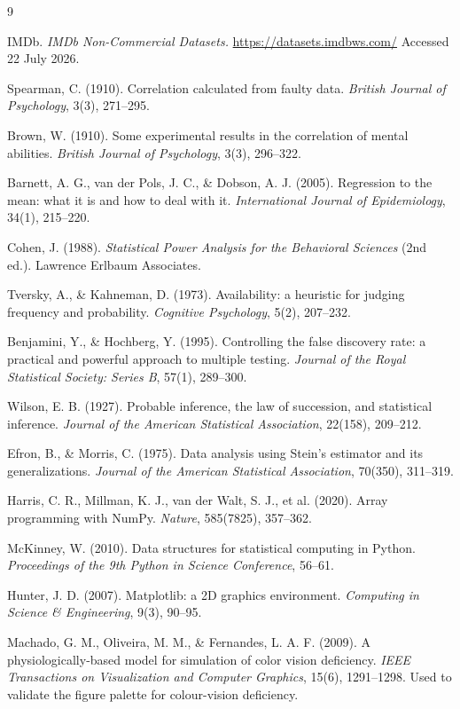 \documentclass[11pt,a4paper]{article}
\begin{document}
\begin{thebibliography}{9}
\small

IMDb. \emph{IMDb Non-Commercial Datasets.} \url{https://datasets.imdbws.com/}
Accessed 22 July 2026.

Spearman, C. (1910). Correlation calculated from faulty data.
\emph{British Journal of Psychology}, 3(3), 271--295.

Brown, W. (1910). Some experimental results in the correlation of mental
abilities. \emph{British Journal of Psychology}, 3(3), 296--322.

Barnett, A. G., van der Pols, J. C., \& Dobson, A. J. (2005). Regression to the
mean: what it is and how to deal with it. \emph{International Journal of
Epidemiology}, 34(1), 215--220.

Cohen, J. (1988). \emph{Statistical Power Analysis for the Behavioral Sciences}
(2nd ed.). Lawrence Erlbaum Associates.

Tversky, A., \& Kahneman, D. (1973). Availability: a heuristic for judging
frequency and probability. \emph{Cognitive Psychology}, 5(2), 207--232.

Benjamini, Y., \& Hochberg, Y. (1995). Controlling the false discovery rate: a
practical and powerful approach to multiple testing. \emph{Journal of the Royal
Statistical Society: Series B}, 57(1), 289--300.

Wilson, E. B. (1927). Probable inference, the law of succession, and statistical
inference. \emph{Journal of the American Statistical Association}, 22(158),
209--212.

Efron, B., \& Morris, C. (1975). Data analysis using Stein's estimator and its
generalizations. \emph{Journal of the American Statistical Association},
70(350), 311--319.

Harris, C. R., Millman, K. J., van der Walt, S. J., et al. (2020). Array
programming with NumPy. \emph{Nature}, 585(7825), 357--362.

McKinney, W. (2010). Data structures for statistical computing in Python.
\emph{Proceedings of the 9th Python in Science Conference}, 56--61.

Hunter, J. D. (2007). Matplotlib: a 2D graphics environment.
\emph{Computing in Science \& Engineering}, 9(3), 90--95.

Machado, G. M., Oliveira, M. M., \& Fernandes, L. A. F. (2009). A
physiologically-based model for simulation of color vision deficiency.
\emph{IEEE Transactions on Visualization and Computer Graphics}, 15(6),
1291--1298. Used to validate the figure palette for colour-vision deficiency.

\end{thebibliography}
\end{document}
